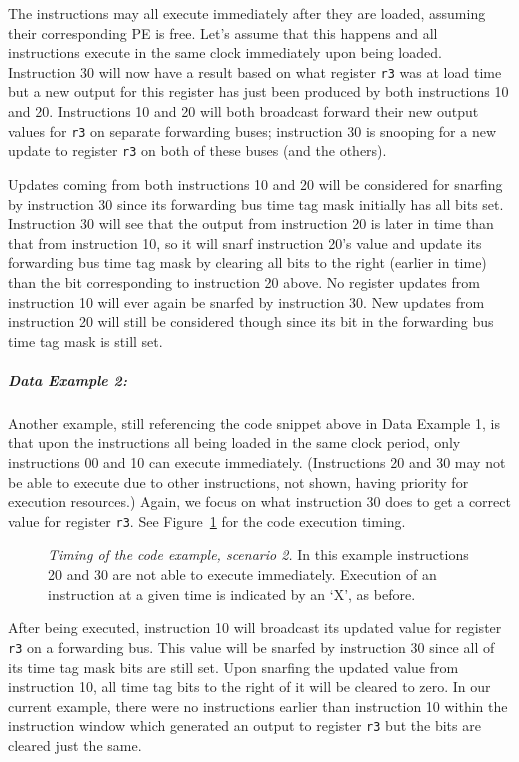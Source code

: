 \documentclass[10pt,dvips]{article}
\begin{document}
The instructions may all execute immediately after they are loaded,
assuming their corresponding PE is free.  Let's assume that this happens
and all instructions execute in the same clock immediately upon being
loaded.
Instruction 30 will now have a result based on what register
{\tt r3}
was at load time but a new output for this
register has just been produced by both instructions 10 and 20.
Instructions 10 and 20 will both broadcast forward their new output
values for
{\tt r3}
on separate forwarding buses; instruction
30 is snooping for a new update
to register
{\tt r3}
on both of these buses (and the others).

Updates coming from both instructions
10 and 20 will be considered for snarfing by instruction 30 since
its forwarding bus time tag mask initially has all bits set.
Instruction 30
will see that the output from instruction 20 is later
in time than that from instruction 10, so it will snarf instruction
20's value
and update its forwarding bus time tag mask by clearing all bits
to the right (earlier in time) than the bit corresponding to
instruction 20 above.  No register updates from instruction 10
will ever again be snarfed by instruction 30.  New updates
from instruction 20 will still be considered though since its
bit in the forwarding bus time tag mask is still set.

\subparagraph{Data Example 2: }
Another example, still referencing the code snippet above
in Data Example 1,
is that upon the instructions all being loaded in the same
clock period, only instructions 00 and 10 can execute immediately.
(Instructions 20 and 30 may not be able to execute due to
other instructions, not shown, having priority for execution
resources.)
Again, we focus on what instruction 30 does to get a correct
value for register
{\tt r3}. See Figure~\ref{ex2} for the code execution timing.

\begin{figure}
\centering
{}
\caption{{\em Timing of the code example, scenario 2.}
In this example instructions 20 and 30 are not able to execute
immediately. Execution of an instruction at a given time is
indicated by an `X', as before.}
\label{ex2}
\end{figure}

After being executed, instruction 10 will broadcast 
its updated value for register
{\tt r3}
on a forwarding bus.
This value will be snarfed by instruction 30 since all of its
time tag mask bits are still set.  Upon snarfing the updated
value from instruction 10, all time tag bits to the right of
it will be cleared to zero.  In our current example, there
were no instructions earlier than instruction 10 within the instruction
window which generated an output to register
{\tt r3}
but the bits are cleared just the same.
\end{document}
